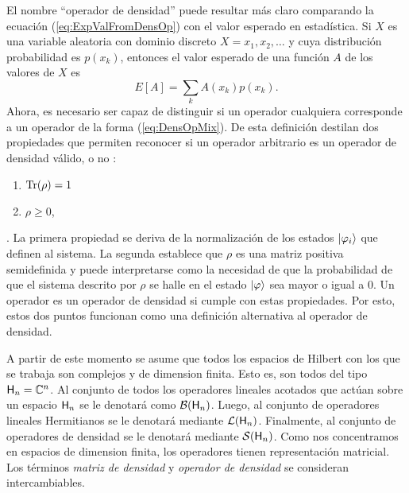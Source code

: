 El nombre ``operador de densidad'' puede resultar más claro comparando la ecuación (\ref{eq:ExpValFromDensOp}) con el valor esperado en estadística. Si $X$ es una variable aleatoria con dominio discreto $X=x_1,x_2,\dots$ y cuya distribución probabilidad es $p(x_k)$, entonces el valor esperado de una función $A$ de los valores de $X$ es
\begin{equation*}
E[A]=\sum_{k} A(x_k) p(x_k).
\end{equation*}
Ahora, es necesario ser capaz de distinguir si un operador cualquiera corresponde a un operador de la forma (\ref{eq:DensOpMix}). De esta definición destilan dos propiedades que permiten reconocer si un operador arbitrario es un operador de densidad válido, o no \cite{Holevo}:
\begin{enumerate}
    \item $\Tr(\rho)=1$
    \item $\rho\geq 0$,
\end{enumerate}
.
La primera propiedad se deriva de la normalización de los estados $\ket{\varphi_{i}}$ que definen al sistema. La segunda establece que $\rho$ es una matriz positiva semidefinida y puede interpretarse como la necesidad de que la probabilidad de que el sistema descrito por $\rho$ se halle en el estado $\ket{\varphi}$ sea mayor o igual a $0$. Un operador es un operador de densidad si  cumple con estas propiedades. Por esto, estos dos puntos funcionan como una definición alternativa al operador de densidad.


A partir de este momento se asume que todos los espacios de Hilbert con los que se trabaja son complejos y de dimension finita. Esto es, son todos del tipo ${\sf H}_{n}=\mathbb{C}^{n}$. Al conjunto de todos los operadores lineales acotados que actúan sobre un espacio ${\sf H}_{n}$ se le denotará como $\mathcal{B}({\sf H}_{n})$. Luego, al conjunto de operadores lineales Hermitianos se le denotará mediante $\mathcal{L}({\sf H}_{n})$. Finalmente, al conjunto de operadores de densidad se le denotará mediante $\mathcal{S}({\sf H}_{n})$. Como nos concentramos en espacios de dimension finita, los operadores tienen representación matricial. Los términos \textit{matriz de densidad} y \textit{operador de densidad} se consideran intercambiables.



